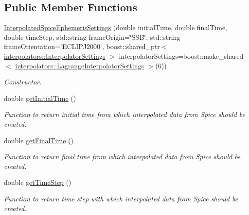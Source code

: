 \subsection*{Public Member Functions}
\begin{DoxyCompactItemize}
\item 
\hyperlink{classtudat_1_1simulation__setup_1_1InterpolatedSpiceEphemerisSettings_afc1dcfeb27f1073bcff03d1bfd2ba15e}{Interpolated\+Spice\+Ephemeris\+Settings} (double initial\+Time, double final\+Time, double time\+Step, std\+::string frame\+Origin=\char`\"{}S\+SB\char`\"{}, std\+::string frame\+Orientation=\char`\"{}E\+C\+L\+I\+P\+J2000\char`\"{}, boost\+::shared\+\_\+ptr$<$ \hyperlink{classtudat_1_1interpolators_1_1InterpolatorSettings}{interpolators\+::\+Interpolator\+Settings} $>$ interpolator\+Settings=boost\+::make\+\_\+shared$<$ \hyperlink{classtudat_1_1interpolators_1_1LagrangeInterpolatorSettings}{interpolators\+::\+Lagrange\+Interpolator\+Settings} $>$(6))
\begin{DoxyCompactList}\small\item\em Constructor. \end{DoxyCompactList}\item 
double \hyperlink{classtudat_1_1simulation__setup_1_1InterpolatedSpiceEphemerisSettings_a7d09a1e6f575d87c7f7f33bb9d7f28a4}{get\+Initial\+Time} ()
\begin{DoxyCompactList}\small\item\em Function to return initial time from which interpolated data from Spice should be created. \end{DoxyCompactList}\item 
double \hyperlink{classtudat_1_1simulation__setup_1_1InterpolatedSpiceEphemerisSettings_a32d620aa07d6e723ed1084cfef9a5a9e}{get\+Final\+Time} ()
\begin{DoxyCompactList}\small\item\em Function to return final time from which interpolated data from Spice should be created. \end{DoxyCompactList}\item 
double \hyperlink{classtudat_1_1simulation__setup_1_1InterpolatedSpiceEphemerisSettings_a462ed5fc8d752e3b39f2624e0b6520e4}{get\+Time\+Step} ()
\begin{DoxyCompactList}\small\item\em Function to return time step with which interpolated data from Spice should be created. \end{DoxyCompactList}\item 

\end{DoxyCompactItemize}
